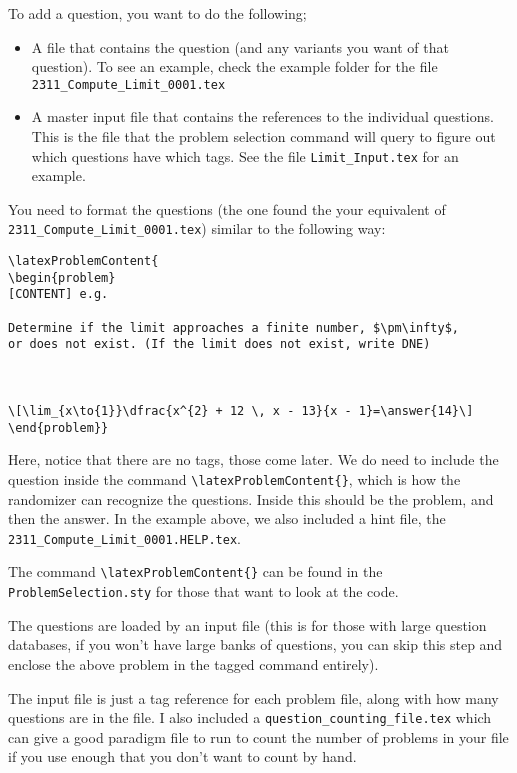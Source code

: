 \documentclass[•]{article}
\begin{document}
To add a question, you want to do the following;

\begin{itemize}
\item A file that contains the question (and any variants you want of that question). To see an example, check the example folder for the file \verb|2311_Compute_Limit_0001.tex|
\item A master input file that contains the references to the individual questions. This is the file that the problem selection command will query to figure out which questions have which tags. See the file \verb|Limit_Input.tex| for an example.

\end{itemize}

You need to format the questions (the one found the your equivalent of \verb|2311_Compute_Limit_0001.tex|) similar to the following way:

\begin{verbatim}
\latexProblemContent{
\begin{problem}
[CONTENT] e.g.

Determine if the limit approaches a finite number, $\pm\infty$, 
or does not exist. (If the limit does not exist, write DNE)



\[\lim_{x\to{1}}\dfrac{x^{2} + 12 \, x - 13}{x - 1}=\answer{14}\]
\end{problem}}
\end{verbatim}


Here, notice that there are no tags, those come later. We do need to include the question inside the command \verb|\latexProblemContent{}|, which is how the randomizer can recognize the questions. Inside this should be the problem, and then the answer. In the example above, we also included a hint file, the \verb|2311_Compute_Limit_0001.HELP.tex|.

The command \verb|\latexProblemContent{}| can be found in the \verb|ProblemSelection.sty| for those that want to look at the code.

The questions are loaded by an input file (this is for those with large question databases, if you won't have large banks of questions, you can skip this step and enclose the above problem in the tagged command entirely).

The input file is just a tag reference for each problem file, along with how many questions are in the file. I also included a \verb|question_counting_file.tex| which can give a good paradigm file to run to count the number of problems in your file if you use enough that you don't want to count by hand.
\end{document}
